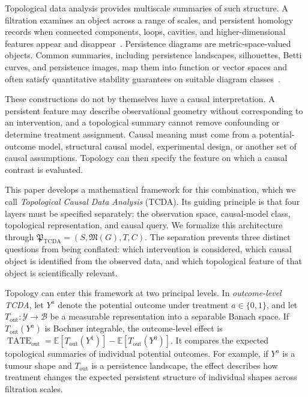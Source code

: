 \documentclass[11pt,a4paper]{article}
\theoremstyle{plain}
\theoremstyle{definition}
\theoremstyle{remark}
\newcommand{\1}{\mathbbm{1}}
\begin{document}
Topological data analysis provides multiscale summaries of such structure. A filtration examines an object across a range of scales, and persistent homology records when connected components, loops, cavities, and higher-dimensional features appear and disappear~\citep{carlsson2009,edelsbrunnerharer2010}. Persistence diagrams are metric-space-valued objects. Common summaries, including persistence landscapes, silhouettes, Betti curves, and persistence images, map them into function or vector spaces and often satisfy quantitative stability guarantees on suitable diagram classes~\citep{bubenik2015,chazal2014stochastic,adams2017}.

These constructions do not by themselves have a causal interpretation. A persistent feature may describe observational geometry without corresponding to an intervention, and a topological summary cannot remove confounding or determine treatment assignment. Causal meaning must come from a potential-outcome model, structural causal model, experimental design, or another set of causal assumptions. Topology can then specify the feature on which a causal contrast is evaluated.

This paper develops a mathematical framework for this combination, which we call \emph{Topological Causal Data Analysis} (TCDA). Its guiding principle is that four layers must be specified separately: the observation space, causal-model class, topological representation, and causal query. We formalize this architecture through
\(\mathfrak P_{\mathrm{TCDA}}=(S,\mathfrak M(G),T,C)\). The separation prevents three distinct questions from being conflated: which intervention is considered, which causal object is identified from the observed data, and which topological feature of that object is scientifically relevant.


Topology can enter this framework at two principal levels. In
\emph{outcome-level TCDA}, let \(Y^a\) denote the potential outcome under treatment \(a\in\{0,1\}\), and let
\(T_{\mathrm{out}}:\mathcal Y\to\mathcal B\) be a measurable representation into a separable Banach space. If
\(T_{\mathrm{out}}(Y^a)\) is Bochner integrable, the outcome-level effect is \(\operatorname{TATE}_{\mathrm{out}} = \mathbb E[T_{\mathrm{out}}(Y^1)] - \mathbb E[T_{\mathrm{out}}(Y^0)]\). It compares the expected topological summaries of individual potential outcomes. For example, if \(Y^a\) is a tumour shape and \(T_{\mathrm{out}}\) is a persistence landscape, the effect describes how treatment changes the expected persistent structure of individual shapes across filtration scales.
\end{document}

